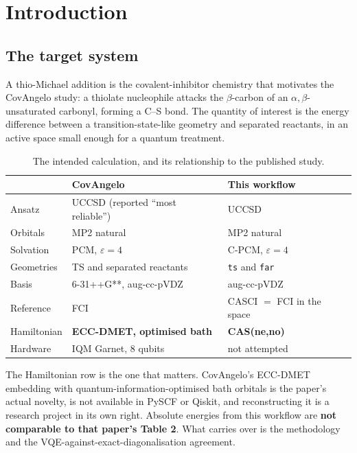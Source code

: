 \documentclass[11pt,a4paper]{article}
\newcommand{\code}[1]{\texttt{\small #1}}
\begin{document}
\section{Introduction}

\subsection{The target system}

A thio-Michael addition is the covalent-inhibitor chemistry that motivates the
CovAngelo study: a thiolate nucleophile attacks the $\beta$-carbon of an
$\alpha,\beta$-unsaturated carbonyl, forming a C--S bond. The quantity of
interest is the energy difference between a transition-state-like geometry and
separated reactants, in an active space small enough for a quantum treatment.

\begin{table}[htbp]
\centering
\caption{The intended calculation, and its relationship to the published study.}
\label{tab:protocol}
\small
\begin{tabular}{lll}
\toprule
& CovAngelo & This workflow \\
\midrule
Ansatz      & UCCSD (reported ``most reliable'') & UCCSD \\
Orbitals    & MP2 natural                        & MP2 natural \\
Solvation   & PCM, $\varepsilon = 4$             & C-PCM, $\varepsilon = 4$ \\
Geometries  & TS and separated reactants         & \code{ts} and \code{far} \\
Basis       & 6-31++G**, aug-cc-pVDZ             & aug-cc-pVDZ \\
Reference   & FCI                                & CASCI $=$ FCI in the space \\
Hamiltonian & \textbf{ECC-DMET, optimised bath}  & \textbf{CAS(ne,no)} \\
Hardware    & IQM Garnet, 8 qubits               & not attempted \\
\bottomrule
\end{tabular}
\end{table}

\begin{caution}
The Hamiltonian row is the one that matters. CovAngelo's ECC-DMET embedding
with quantum-information-optimised bath orbitals is the paper's actual novelty,
is not available in PySCF or Qiskit, and reconstructing it is a research project
in its own right. Absolute energies from this workflow are \textbf{not
comparable to that paper's Table 2}. What carries over is the methodology and
the VQE-against-exact-diagonalisation agreement.
\end{caution}
\end{document}
